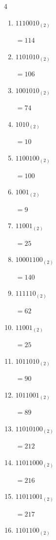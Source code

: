 \begin{multicols}{4}
\begin{enumerate}
        $=79$

  \item $1110010_{(2)}$

        $=114$

  \item $1101010_{(2)}$

        $=106$

  \item $1001010_{(2)}$

        $=74$

  \item $1010_{(2)}$

        $=10$

  \item $1100100_{(2)}$

        $=100$

  \item $1001_{(2)}$

        $=9$

  \item $11001_{(2)}$

        $=25$

\columnbreak %

  \item $10001100_{(2)}$

        $=140$

  \item $111110_{(2)}$

        $=62$

  \item $11001_{(2)}$

        $=25$

  \item $1011010_{(2)}$

        $=90$

  \item $1011001_{(2)}$

        $=89$

  \item $11010100_{(2)}$

        $=212$

  \item $11011000_{(2)}$

        $=216$

  \item $11011001_{(2)}$

        $=217$

  \item $1101100_{(2)}$


\end{enumerate}
\end{multicols}
